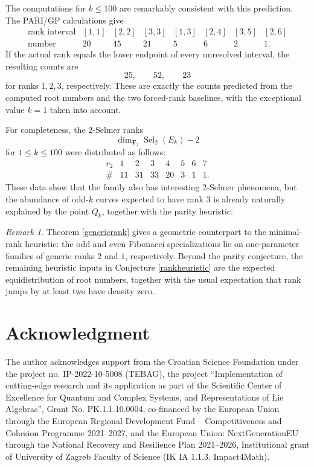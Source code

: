 \documentclass[11pt]{amsart}
\theoremstyle{remark}
\newtheorem{remark}[theorem]{Remark}
\begin{document}
The computations for $k\leq100$ are remarkably consistent with this
prediction.  The PARI/GP calculations give
\[
\begin{array}{c|rrrrrrr}
\text{rank interval}&[1,1]&[2,2]&[3,3]&[1,3]&[2,4]&[3,5]&[2,6]\\
\hline
\text{number}&20&45&21&5&6&2&1.
\end{array}
\]
If the actual rank equals the
lower endpoint of every unresolved
interval, the resulting counts are
\[
 25,\qquad52,\qquad23
\]
for ranks $1,2,3$, respectively.  These are exactly the counts predicted
from the computed root numbers and the two forced-rank baselines, with
the exceptional value $k=1$ taken into account.

For completeness, the $2$-Selmer ranks
\[
 \dim_{\mathbf F_2}\operatorname{Sel}_2(E_k)-2
\]
for $1\leq k\leq100$ were distributed as follows:
\[
\begin{array}{c|rrrrrrr}
r_2&1&2&3&4&5&6&7\\ \hline
\#&11&31&33&20&3&1&1.
\end{array}
\]
These data show that the family also has interesting $2$-Selmer
phenomena, but the abundance of odd-$k$ curves expected to have rank
$3$ is already naturally explained by the point $Q_k$, together with
the parity heuristic.

\begin{remark}
Theorem \ref{genericrank} gives a geometric counterpart to the
minimal-rank heuristic: the odd and even Fibonacci specializations lie
on one-parameter families of generic ranks $2$ and $1$, respectively. 
Beyond the parity conjecture, the remaining
heuristic inputs in Conjecture \ref{rankheuristic} are the
expected equidistribution of root numbers, together with the usual
expectation that rank jumps by at least two have density zero.
\end{remark}

\section*{Acknowledgment}

The author acknowledges support from
the Croatian Science Foundation under the
project no. IP-2022-10-5008 (TEBAG),
the project ``Implementation of cutting-edge research and its application as part of the
Scientific Center of Excellence for Quantum and Complex Systems, and Representations of Lie Algebras'', Grant No. PK.1.1.10.0004, co-financed by the European
Union through the European Regional Development Fund -- Competitiveness and
Cohesion Programme 2021--2027,
and the European Union:
NextGenerationEU through the National Recovery and Resilience Plan 2021--2026, Institutional grant of University of Zagreb Faculty of Science (IK IA 1.1.3. Impact4Math).
\end{document}
